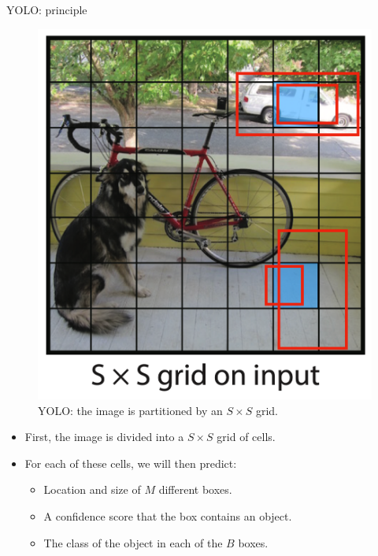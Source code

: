 \documentclass[xcolor=pdftex,dvipsnames,table]{beamer}
\begin{document}
\begin{frame}{YOLO: principle}
\begin{figure}[htb]
   \centering
   \includegraphics[height=0.4\textheight]{../graphics/YOLO_2.pdf}
   \caption{YOLO: the image is partitioned by an $S \times S$ grid.}
\end{figure}
\begin{itemize}
   \item First, the image is divided into a $S \times S$ grid of cells. 
   \item For each of these cells, we will then predict:
   \begin{itemize}
      \item Location and size of $M$ different boxes. 
      \item A confidence score that the box contains an object. 
      \item The class of the object in each of the $B$ boxes. 
   \end{itemize}
\end{itemize}
\end{frame}
\end{document}
